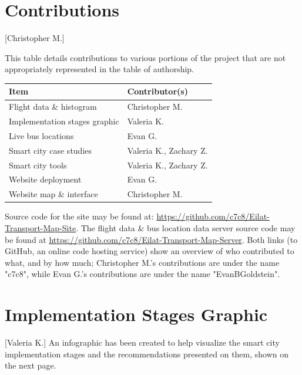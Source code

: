 \documentclass[12pt]{article}                               %
\begin{document}

\newpage


\newpage

\begin{appendices}
\section{Contributions}[Christopher M.]

This table details contributions to various portions of the project that are not appropriately represented in the table of authorship.

\begin{table}[H]
    \centering
    \begin{tabular}{l|l}
        \textbf{Item} & \textbf{Contributor(s)} \\
        \hline{}Flight data \& histogram& Christopher M. \\
        Implementation stages graphic   & Valeria K. \\
        Live bus locations              & Evan G. \\
        Smart city case studies         & Valeria K., Zachary Z. \\
        Smart city tools                & Valeria K., Zachary Z. \\
        Website deployment              & Evan G. \\
        Website map \& interface        & Christopher M.
    \end{tabular}
\end{table}

Source code for the site may be found at: \url{https://github.com/c7c8/Eilat-Transport-Map-Site}. The flight data \& bus location data server source code may be found at \url{https://github.com/c7c8/Eilat-Transport-Map-Server}. Both links (to GitHub, an online code hosting service) show an overview of who contributed to what, and by how much; Christopher M.'s contributions are under the name "c7c8", while Evan G.'s contributions are under the name "EvanBGoldstein".

\section{Implementation Stages Graphic}[Valeria K.]
An infographic has been created to help visualize the smart city implementation stages and the recommendations presented on them, shown on the next page.




\end{appendices}
\end{document}
